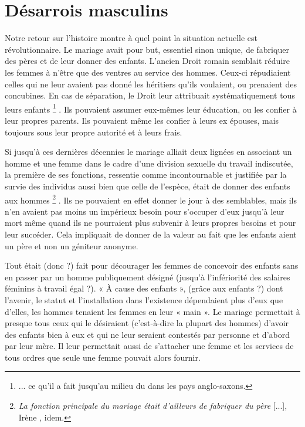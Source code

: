 
\chapter{Désarrois masculins}


 Notre retour sur l'histoire montre à quel point la situation actuelle est révolutionnaire. Le mariage avait pour but, essentiel sinon unique, de fabriquer des pères et de leur donner des enfants. L'ancien Droit romain semblait réduire les femmes à n'être que des ventres au service des hommes. Ceux-ci répudiaient celles qui ne leur avaient pas donné les héritiers qu'ils voulaient, ou prenaient des concubines. En cas de séparation, le Droit leur attribuait systématiquement tous leurs enfants%
\footnote{... ce qu'il a fait jusqu'au milieu du  dans les pays anglo-saxons.}%
. Ils pouvaient assumer eux-mêmes leur éducation, ou les confier à leur propres parents. Ils pouvaient même les confier à leurs ex épouses, mais toujours sous leur propre autorité et à leurs frais.

 Si jusqu'à ces dernières décennies le mariage alliait deux lignées en associant un homme et une femme dans le cadre d'une division sexuelle du travail indiscutée, la première de ses fonctions, ressentie comme incontournable et justifiée par la survie des individus aussi bien que celle de l'espèce, était de donner des enfants aux hommes%
\footnote{{\emph{La fonction principale du mariage était d'ailleurs de fabriquer du père} [...]}, Irène , idem.}%
. Ils ne pouvaient en effet donner le jour à des semblables, mais ils n'en avaient pas moins un impérieux besoin pour s'occuper d'eux jusqu'à leur mort même quand ils ne pourraient plus subvenir à leurs propres besoins et pour leur succéder. Cela impliquait de donner de la valeur au fait que les enfants aient un père et non un géniteur anonyme. 
 
 Tout était (donc ?) fait pour décourager les femmes de concevoir des enfants sans en passer par un homme publiquement désigné (jusqu'à l'infériorité des salaires féminins à travail égal ?). « À cause des enfants », (grâce aux enfants ?) dont l'avenir, le statut et l'installation dans l'existence dépendaient plus d'eux que d'elles, les hommes tenaient les femmes en leur « main ». Le mariage permettait à presque tous ceux qui le désiraient (c'est-à-dire la plupart des hommes) d'avoir des enfants bien à eux et qui ne leur seraient contestés par personne et d'abord par leur mère. Il leur permettait aussi de s'attacher une femme et les services de tous ordres que seule une femme pouvait alors fournir. 
 
